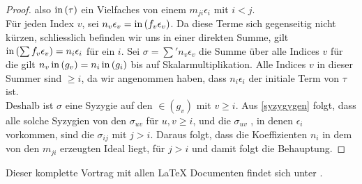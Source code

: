 \documentclass{article}
\begin{document}
\begin{thm}
\begin{proof}
			also
			\( \operatorname{in}\left( \tau \right) \)
			ein Vielfaches von einem
			\( m_{ji} \epsilon_{i} \)
			mit
			\( i<j \).\\
			F\"ur jeden Index
			\(v \),
			sei
			\(n_{v} \epsilon_{v}
			=\operatorname{in}\left( f_{v}\epsilon_{v} \right) \).
			Da diese Terme sich gegenseitig nicht k\"urzen,
			schliesslich befinden wir uns in einer direkten Summe,
			gilt
			\( { \operatorname{in}\left( \sum f_{v}\epsilon_{v} \right)=
			n_{i}\epsilon_{i} }\)
			f\"ur ein 
			\( i\).
			Sei
			\( \sigma=\sum'n_{v} \epsilon_{v} \)
			die Summe \"uber alle Indices
			\( v \)
			f\"ur die gilt
			\( n_v \operatorname{in} \left( g_{v} \right)
			=n_{i} \operatorname{in}\left( g_{i} \right) \)
			bis auf Skalarmultiplikation.
			Alle Indices
			\( v \)
			in dieser Summer sind 
			\( \ge i \),
			da wir angenommen haben,
			dass 
			\( n_{i} \epsilon_{i} \)
			der initiale Term von 
			\( \tau \)
			ist. \\
			Deshalb ist 
			\( \sigma \)
			eine Syzygie auf den
			\( \in\left( g_{v} \right) \)
			mit 
			\( v \ge i\).
			Aus  \ref{syzygygen} 
			folgt, 
			dass alle solche Syzygien von den
			\( \sigma_{uv} \)
			f\"ur 
			\( u,v \ge i \),
			und die 
			\( \sigma_{uv} \) ,
			in denen 
			\( \epsilon_{i} \) 
			vorkommen,
			sind die
			\( \sigma_{ij}\)
			mit
			\( j > i \).
			Daraus folgt, 
			dass die Koeffizienten 
			\(n_{i}\)
			in dem von den 
			\(m_{ji}\) 
			erzeugten Ideal liegt,
			f\"ur 
			\( j> i \)
			und damit folgt die Behauptung.
		\end{proof}
	\end{thm}
	Dieser komplette Vortrag mit allen LaTeX Documenten findet sich unter \cite{GitHub927589452}.


\end{document}
